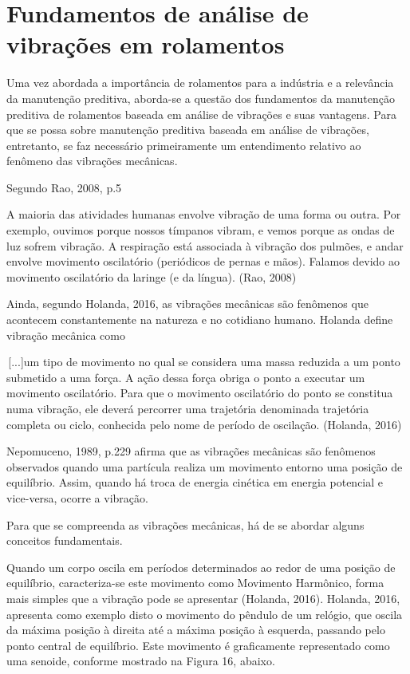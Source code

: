 \documentclass[
	12pt,				
	oneside,			
	a4paper,			
	english,			
	brazil				
	]{abntex2ppgsi}
\begin{document}
\section{\textbf{Fundamentos de análise de vibrações em rolamentos}}

Uma vez abordada a importância de rolamentos para a indústria e a relevância da manutenção preditiva, aborda-se a questão dos fundamentos da manutenção preditiva de rolamentos baseada em análise de vibrações e suas vantagens. Para que se possa sobre manutenção preditiva baseada em análise de vibrações, entretanto, se faz necessário primeiramente um entendimento relativo ao fenômeno das vibrações mecânicas. 

Segundo Rao, 2008, p.5

\begin{citacao}
A maioria das atividades humanas envolve vibração de uma forma ou outra. Por exemplo, ouvimos porque nossos tímpanos vibram, e vemos porque as ondas de luz sofrem vibração. A respiração está associada à vibração dos pulmões, e andar envolve movimento oscilatório (periódicos de pernas e mãos). Falamos devido ao movimento oscilatório da laringe (e da língua). (Rao, 2008)
\end{citacao}

Ainda, segundo Holanda, 2016, as vibrações mecânicas são fenômenos que acontecem constantemente na natureza e no cotidiano humano. Holanda define vibração mecânica como

\begin{citacao}
\,[...]um tipo de movimento no qual se considera uma massa reduzida a um ponto submetido a uma força. A ação dessa força obriga o ponto a executar um movimento oscilatório. Para que o movimento oscilatório do ponto se constitua numa vibração, ele deverá percorrer uma trajetória denominada trajetória completa ou ciclo, conhecida pelo nome de período de oscilação. (Holanda, 2016)
\end{citacao}

Nepomuceno, 1989, p.229 afirma que as vibrações mecânicas são fenômenos observados quando uma partícula realiza um movimento entorno uma posição de equilíbrio. Assim, quando há troca de energia cinética em energia potencial e vice-versa, ocorre a vibração. 

Para que se compreenda as vibrações mecânicas, há de se abordar alguns conceitos fundamentais. 

Quando um corpo oscila em períodos determinados ao redor de uma posição de equilíbrio, caracteriza-se este movimento como Movimento Harmônico, forma mais simples que a vibração pode se apresentar (Holanda, 2016). Holanda, 2016, apresenta como exemplo disto o movimento do pêndulo de um relógio, que oscila da máxima posição à direita até a máxima posição à esquerda, passando pelo ponto central de equilíbrio. Este movimento é graficamente representado como uma senoide, conforme mostrado na Figura 16, abaixo.
\end{document}
